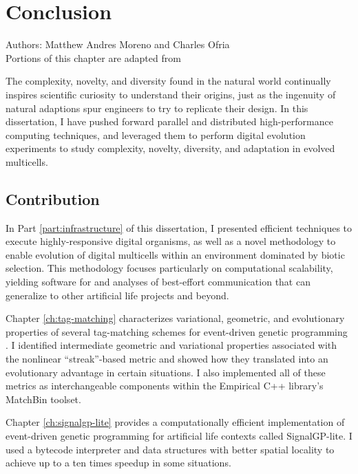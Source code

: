 \chapter{Conclusion}
\label{ch:conclusion}

\noindent
Authors: Matthew Andres Moreno and Charles Ofria \\
Portions of this chapter are adapted from ~\citep{moreno2020practical}

The complexity, novelty, and diversity found in the natural world continually inspires scientific curiosity to understand their origins, just as the ingenuity of natural adaptions spur engineers to try to replicate their design.
In this dissertation, I have pushed forward parallel and distributed high-performance computing techniques, and leveraged them to perform digital evolution experiments to study complexity, novelty, diversity, and adaptation in evolved multicells.

\section{Contribution}

In Part \ref{part:infrastructure} of this dissertation, I presented efficient techniques to execute highly-responsive digital organisms, as well as a novel methodology to enable evolution of digital multicells within an environment dominated by biotic selection.
This methodology focuses particularly on computational scalability, yielding software for and analyses of best-effort communication that can generalize to other artificial life projects and beyond.

Chapter \ref{ch:tag-matching} characterizes variational, geometric, and evolutionary properties of several tag-matching schemes for event-driven genetic programming \citep{lalejini2018evolving}.
I identified intermediate geometric and variational properties associated with the nonlinear ``streak''-based metric \citep{downing2015intelligence} and showed how they translated into an evolutionary advantage in certain situations.
I also implemented all of these metrics as interchangeable components within the Empirical C++ library's MatchBin toolset.

Chapter \ref{ch:signalgp-lite} provides a computationally efficient implementation of event-driven genetic programming for artificial life contexts called SignalGP-lite.
I used a bytecode interpreter and data structures with better spatial locality to achieve up to a ten times speedup in some situations.

